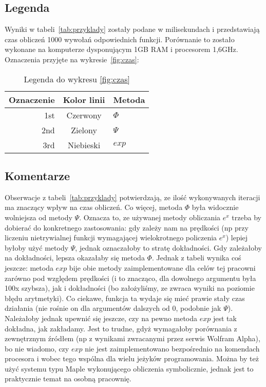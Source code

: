 \documentclass[11pt,wide]{mwart}
\begin{document}
\subsection{Legenda}
Wyniki w tabeli~\ref{tab:przyklady} zostały podane w milisekundach i przedstawiają czas obliczeń 1000 wywołań odpowiednich funkcji. Porównanie to zostało wykonane na komputerze dysponującym 1GB RAM i procesorem 1,6GHz. Oznaczenia przyjęte na wykresie~\ref{fig:czas}:
\begin{table}[h]
\centering
\begin{tabular}{r c l}
  \hline
  Oznaczenie & Kolor linii & Metoda\\
  \hline
  1st        & Czerwony    & $\Phi$\\
  2nd        & Zielony     & $\Psi$\\
  3rd        & Niebieski   & $exp$\\
  \hline
\end{tabular}
\label{tab:legendawykr2}
\caption{Legenda do wykresu \ref{fig:czas}}
\end{table}
\subsection{Komentarze}
Obserwacje z tabeli~\ref{tab:przyklady} potwierdzają, ze ilość wykonywanych iteracji ma znaczący wpływ na czas obliczeń. Co więcej, metoda $\Phi$ była widocznie wolniejsza od metody $\Psi$. Oznacza to, ze używanej metody obliczania $e^x$ trzeba by dobierać do konkretnego zastosowania: gdy zależy nam na prędkości (np przy liczeniu nietrywialnej funkcji wymagającej wielokrotnego policzenia $e^x$) lepiej byłoby użyć metody $\Psi$, jednak oznaczałoby to stratę dokładności. Gdy zależałoby na dokładności, lepsza okazałaby się metoda $\Phi$. Jednak z tabeli wynika coś jeszcze: metoda $exp$ bije obie metody zaimplementowane dla celów tej pracowni zarówno pod względem prędkości (i to znacząco, dla dowolnego argumentu była 100x szybsza), jak i dokładności (bo założyliśmy, ze zwraca wyniki na poziomie błędu arytmetyki). Co ciekawe, funkcja ta wydaje się mieć prawie stały czas działania (nie rośnie on dla argumentów dalszych od 0, podobnie jak $\Psi$). Należałoby jednak upewnić się jeszcze, czy na pewno metoda $exp$ jest tak dokładna, jak zakładamy. Jest to trudne, gdyż wymagałoby porównania z zewnętrznym źródłem (np z wynikami zwracanymi przez serwis Wolfram Alpha), bo nie wiadomo, czy $exp$ nie jest zaimplementowano bezpośrednio na komendach procesora i wobec tego wspólna dla wielu jeżyków programowania. Można by też użyć systemu typu Maple wykonującego obliczenia symbolicznie, jednak jest to praktycznie temat na osobną pracownię.
\end{document}
